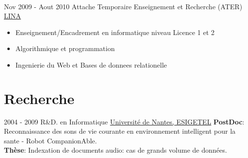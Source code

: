 \documentclass[letterpaper]{twentysecondcv} %
\begin{document}
\begin{twenty}
       \\
	\twentyitem
	{Nov 2009 -}
	{Aout 2010}
	{Attache Temporaire Enseignement et Recherche (ATER)}
	{\href{http://www.lina.univ-nantes.fr/}{LINA}}
	{}
	{
		\begin{itemize}
			\item Enseignement/Encadrement en informatique niveau Licence 1 et 2
			\item Algorithmique et programmation
			\item Ingenierie du Web et Bases de donnees relationelle
		\end{itemize}
	}
\end{twenty}

\section{Recherche}
\begin{twenty}
	\twentyitem
    	{2004 - 2009}
		{}
        {R\&D. en Informatique}
        {\href{https://www.univ-nantes.fr/}{Université de Nantes, ESIGETEL}}
        {}
        {
        \textbf{PostDoc}: Reconnaissance des sons de vie courante en environnement intelligent pour la sante - Robot CompanionAble. \\
       	\textbf{Thèse}: Indexation de documents audio: cas de grands volume de données.
        {
	}
        }
  
\end{twenty}

\end{document}
